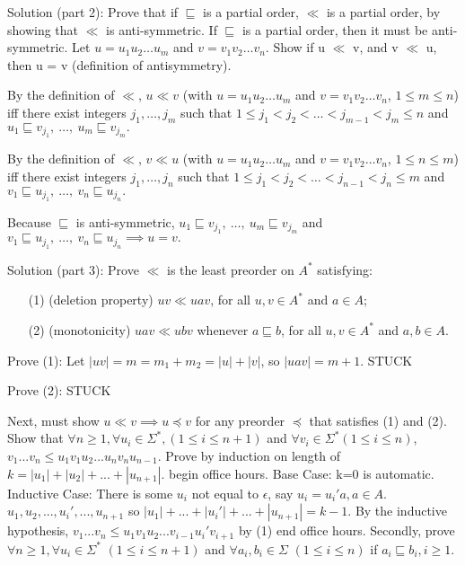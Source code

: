 \documentclass[12pt]{article}
\begin{document}
\medskip
\medskip

Solution (part 2): Prove that if $\sqsubseteq $ is a partial order, $\ll$ is a partial order, by showing that $\ll$ is anti-symmetric. If $\sqsubseteq $ is a
partial order, then it must be anti-symmetric. Let $u=u_{1}u_{2}\ldots u_{m}$ and
$v=v_{1}v_{2}\ldots v_{n}$. Show if u $\ll$ v, and v $\ll$ u, then u = v (definition of antisymmetry).
\medskip

By the definition of $\ll$, $u \ll v$ (with $u=u_{1}u_{2}\ldots u_{m}$ and
$v=v_{1}v_{2}\ldots v_{n}$, $1\leq m\leq n$) iff there exist integers $j_{1},\ldots,j_{m}$ such that
$1\leq j_{1} < j_{2} < \ldots < j_{m-1} < j_{m} \leq n$ and
$u_{1} \sqsubseteq v_{j_{1}},\ \ldots,\ u_{m} \sqsubseteq v_{j_{m}}.$

By the definition of $\ll$, $v \ll u$ (with $u=u_{1}u_{2}\ldots u_{m}$ and
$v=v_{1}v_{2}\ldots v_{n}$, $1\leq n\leq m$) iff there exist integers $j_{1},\ldots,j_{n}$ such that
$1\leq j_{1} < j_{2} < \ldots < j_{n-1} < j_{n} \leq m$ and
$v_{1} \sqsubseteq u_{j_{1}},\ \ldots,\ v_{n} \sqsubseteq u_{j_{n}}.$

\medskip

Because $\sqsubseteq $ is anti-symmetric, $u_{1} \sqsubseteq v_{j_{1}},\ \ldots,\ u_{m} \sqsubseteq v_{j_{m}}$ and
$v_{1} \sqsubseteq u_{j_{1}},\ \ldots,\ v_{n} \sqsubseteq u_{j_{n}} \implies u = v.$


\medskip
\medskip

Solution (part 3): Prove $\ll$ is the least preorder on $A^\ast$ satisfying:
\begin{enumerate}
\item[(1)] (deletion property)
$uv \ll uav$, for all $u, v\in A^{*}$ and $a\in A$;
\medskip
\item[(2)] (monotonicity)
$uav \ll ubv$ whenever $a \sqsubseteq b$, for all $u, v\in A^{*}$ and $a, b\in A$.
\end{enumerate}

Prove (1): Let $|uv| = m = m_1 + m_2 = |u| + |v|$, so $|uav| = m+1$.
STUCK

\medskip

Prove (2): STUCK

Next, must show $u \ll v \implies u \preceq v$ for any preorder $ \preceq $ that satisfies (1) and (2).
Show that $\forall n \ge 1, \forall u_i \in \Sigma^\ast , (1 \le i \le n+1)$ and $ \forall v_i \in \Sigma^\ast (1 \le i \le n)$,
$v_1...v_n \le u_1v_1u_2...u_nv_nu_{n-1}$. Prove by induction on length of $k= |u_1|+|u_2|+ ... +|u_{n+1}|.$ 
begin office hours. Base Case: k=0 is automatic. Inductive Case: There is some $u_i$ not equal to $ \epsilon$, say $u_i = u_i ' a, a \in A$.
$u_1 ,u_2 , ... , u_i ' , ... , u_{n+1}$  so  $|u_1| + ... + |u_i '| + ... + |u_{n+1}| = k-1$. By the inductive hypothesis,
$v_1 ... v_n \le u_1 v_1 u_2 ... v_{i-1} u_i ' v_{i+1}$ by (1) end office hours.
Secondly, prove
$ \forall n \ge 1, \forall u_i \in \Sigma^\ast$ $(1 \le i \le n+1)$ and $\forall a_i,b_i \in \Sigma$ $(1 \le i \le n)$ 
if $a_i \sqsubseteq b_i, i \ge 1.$
\end{document}
